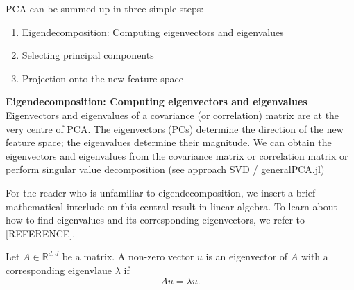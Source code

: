 \documentclass[journal, a4paper]{IEEEtran}
\begin{document}




PCA can be summed up in three simple steps:
\begin{enumerate}
	\item Eigendecomposition: Computing eigenvectors and eigenvalues
	\item Selecting principal components
	\item Projection onto the new feature space
\end{enumerate}
\newline
\textbf{Eigendecomposition: Computing eigenvectors and eigenvalues}\\
Eigenvectors and eigenvalues of a covariance (or correlation) matrix are at the very centre of PCA. The eigenvectors (PCs) determine the direction of the new feature space; the eigenvalues determine their magnitude. 
We can obtain the eigenvectors and eigenvalues from the covariance matrix or correlation matrix or perform singular value decomposition (see approach SVD / generalPCA.jl)

For the reader who is unfamiliar to eigendecomposition, we insert a brief mathematical interlude on this central result in linear algebra. To learn about how to find eigenvalues and its corresponding eigenvectors, we refer to [REFERENCE].

Let \( A \in \mathbb{R}^{d,d}\) be a matrix. A non-zero vector \( u \) is an eigenvector of \( A \) with a corresponding eigenvlaue \( \lambda \) if 
\begin{equation}
	A u = \lambda u .
\end{equation}
\end{document}
